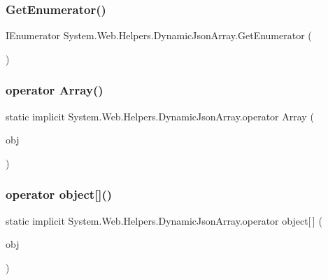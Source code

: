 \subsubsection{\texorpdfstring{Get\+Enumerator()}{GetEnumerator()}}
{\footnotesize\ttfamily I\+Enumerator System.\+Web.\+Helpers.\+Dynamic\+Json\+Array.\+Get\+Enumerator (\begin{DoxyParamCaption}{ }\end{DoxyParamCaption})}

\mbox{\label{classSystem_1_1Web_1_1Helpers_1_1DynamicJsonArray_a4f1b74ac91d5f8f3a2b95475e05c4ad7}} 
\subsubsection{\texorpdfstring{operator Array()}{operator Array()}}
{\footnotesize\ttfamily static implicit System.\+Web.\+Helpers.\+Dynamic\+Json\+Array.\+operator Array (\begin{DoxyParamCaption}\item[{\hyperlink{classSystem_1_1Web_1_1Helpers_1_1DynamicJsonArray}{Dynamic\+Json\+Array}}]{obj }\end{DoxyParamCaption})\hspace{0.3cm}{\ttfamily [static]}}

\mbox{\label{classSystem_1_1Web_1_1Helpers_1_1DynamicJsonArray_aa4bc62411aa6ec4bed9c8551a110d62a}} 
\subsubsection{\texorpdfstring{operator object[]()}{operator object[]()}}
{\footnotesize\ttfamily static implicit System.\+Web.\+Helpers.\+Dynamic\+Json\+Array.\+operator object\mbox{[}$\,$\mbox{]} (\begin{DoxyParamCaption}\item[{\hyperlink{classSystem_1_1Web_1_1Helpers_1_1DynamicJsonArray}{Dynamic\+Json\+Array}}]{obj }\end{DoxyParamCaption})\hspace{0.3cm}{\ttfamily [static]}}

